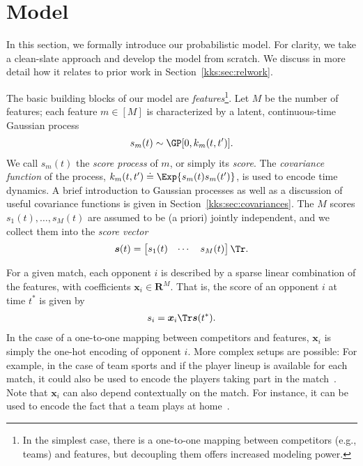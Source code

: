 \section{Model}
\label{kks:sec:model}

In this section, we formally introduce our probabilistic model.
For clarity, we take a clean-slate approach and develop the model from scratch.
We discuss in more detail how it relates to prior work in Section~\ref{kks:sec:relwork}.

The basic building blocks of our model are \emph{features}\footnote{%
	In the simplest case, there is a one-to-one mapping between competitors (e.g., teams) and features, but decoupling them offers increased modeling power.}.
Let $M$ be the number of features; each feature $m \in [M]$ is characterized by a latent, continuous-time Gaussian process
\begin{align}
	\label{kks:eq:score}
	s_m(t) \sim \GP[0, k_m(t, t')].
\end{align}
We call $s_m(t)$ the \emph{score process} of $m$, or simply its \emph{score}.
The \emph{covariance function} of the process, $k_m(t, t') \doteq \Exp{s_m(t) s_m(t')}$, is used to encode time dynamics.
A brief introduction to Gaussian processes as well as a discussion of useful covariance functions is given in Section~\ref{kks:sec:covariances}.
The $M$ scores $s_1(t), \dots, s_M(t)$ are assumed to be (a priori) jointly independent, and we collect them into the \emph{score vector}
\begin{align*}
	\bm{s}(t) = \begin{bmatrix}s_1(t) & \cdots & s_M(t) \end{bmatrix}\Tr.
\end{align*}

For a given match, each opponent $i$ is described by a sparse linear combination of the features, with coefficients $\bm{x}_i \in \mathbf{R}^M$.
That is, the score of an opponent $i$ at time $t^*$ is given by
\begin{align}
	\label{kks:eq:compscore}
	s_i = \bm{x}_i\Tr \bm{s}(t^*).
\end{align}
In the case of a one-to-one mapping between competitors and features, $\bm{x}_i$ is simply the one-hot encoding of opponent $i$.
More complex setups are possible: For example, in the case of team sports and if the player lineup is available for each match, it could also be used to encode the players taking part in the match~\citep{maystre2016player}.
Note that $\bm{x}_i$ can also depend contextually on the match.
For instance, it can be used to encode the fact that a team plays at home~\citep{agresti2012categorical}.

